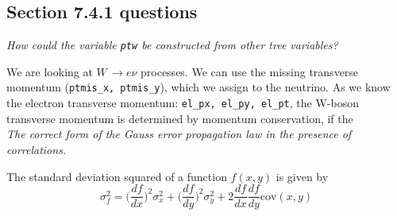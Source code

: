 \documentclass[twocolumn]{article}
\begin{document}
\subsection{Section 7.4.1 questions}
\textit{How could the variable \texttt{ptw} be constructed from other tree variables?}\\
\par We are looking at $W \, \rightarrow e \nu$ processes. We can use the missing transverse momentum (\texttt{ptmis\_x, ptmis\_y}), which we assign to the neutrino. As we know the electron transverse momentum: \texttt{el\_px, el\_py, el\_pt}, the W-boson transverse momentum is determined by momentum conservation, if the \\[14pt]
\textit{The correct form of the Gauss error propagation law in the presence of correlations.}\\
\par The standard deviation squared of a function $f(x,y)$ is given by
\begin{equation}
\sigma_f^2 = \Big(\frac{df}{dx}\Big)^2 \sigma_x^2 + \Big( \frac{df}{dy} \Big)^2 \sigma_y^2 + 2 \frac{df}{dx}\frac{df}{dy}\text{cov}(x,y)
\end{equation}
\end{document}
